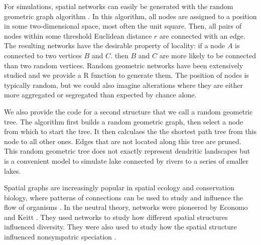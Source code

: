 \documentclass[12pt]{article}
\begin{document}
For simulations, spatial networks can easily be generated with the random
geometric graph algorithm \cite{sed01}. In this algorithm, all nodes are
assigned to a position in some two-dimensional space, most often the unit
square. Then, all pairs of nodes within some threshold Euclidean distance $r$
are connected with an edge. The resulting networks have the desirable property
of locality: if a node $A$ is connected to two vertices $B$ and $C$. then $B$
and $C$ are more likely to be connected than two random vertices. Random
geometric networks have been extensively studied \cite{app97a,app97
b,app02a,app02b,pen03} and we provide a R function to generate them. The
position of nodes is typically random, but we could also imagine alterations
where they are either more aggregated or segregated than expected by chance
alone.

We also provide the code for a second structure that we call a random geometric
tree. The algorithm first builds a random geometric graph, then select a node
from which to start the tree. It then calculaes the the shortest path tree
\cite{dij59} from this node to all other ones. Edges that are not located along
this tree are pruned. This random geometric tree does not exactly represent
dendritic landscapes but is a convenient model to simulate lake connected by
rivers to a series of smaller lakes.

Spatial graphs are increasingly popular in spatial ecology and conservation
biology, where patterns of connections can be used to study and influence the
flow of organisms \cite{min07,fal07,min08,gar08,urb09,dal10}. In the neutral
theory, networks were pioneered by Economo and Keitt \cite{eco08, eco10}. They
used networks to study how different spatial structures influenced diversity.
They were also used to study how the spatial structure influenced nonsympatric
speciation \cite{des12,des12b}.
\end{document}
